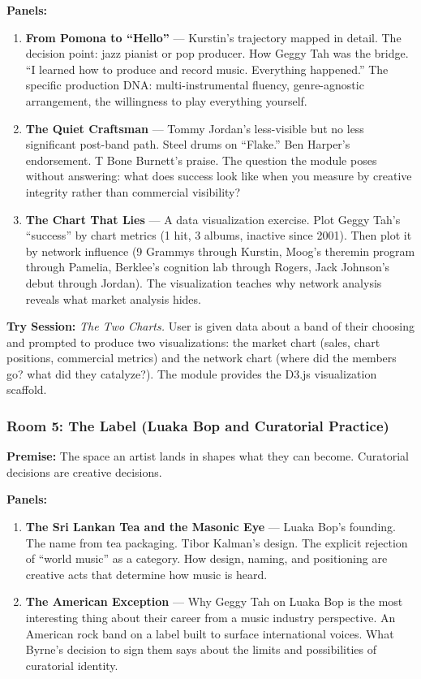 \documentclass[11pt,letterpaper]{article}
\begin{document}
\textbf{Panels:}
\begin{enumerate}[leftmargin=2em]
\item \textbf{From Pomona to ``Hello''} --- Kurstin's trajectory mapped in detail. The decision point: jazz pianist or pop producer. How Geggy Tah was the bridge. ``I learned how to produce and record music. Everything happened.'' The specific production DNA: multi-instrumental fluency, genre-agnostic arrangement, the willingness to play everything yourself.
\item \textbf{The Quiet Craftsman} --- Tommy Jordan's less-visible but no less significant post-band path. Steel drums on ``Flake.'' Ben Harper's endorsement. T Bone Burnett's praise. The question the module poses without answering: what does success look like when you measure by creative integrity rather than commercial visibility?
\item \textbf{The Chart That Lies} --- A data visualization exercise. Plot Geggy Tah's ``success'' by chart metrics (1 hit, 3 albums, inactive since 2001). Then plot it by network influence (9 Grammys through Kurstin, Moog's theremin program through Pamelia, Berklee's cognition lab through Rogers, Jack Johnson's debut through Jordan). The visualization teaches why network analysis reveals what market analysis hides.
\end{enumerate}

\textbf{Try Session:} \textit{The Two Charts.} User is given data about a band of their choosing and prompted to produce two visualizations: the market chart (sales, chart positions, commercial metrics) and the network chart (where did the members go? what did they catalyze?). The module provides the D3.js visualization scaffold.

\subsubsection{Room 5: The Label (Luaka Bop and Curatorial Practice)}

\textbf{Premise:} The space an artist lands in shapes what they can become. Curatorial decisions are creative decisions.

\textbf{Panels:}
\begin{enumerate}[leftmargin=2em]
\item \textbf{The Sri Lankan Tea and the Masonic Eye} --- Luaka Bop's founding. The name from tea packaging. Tibor Kalman's design. The explicit rejection of ``world music'' as a category. How design, naming, and positioning are creative acts that determine how music is heard.
\item \textbf{The American Exception} --- Why Geggy Tah on Luaka Bop is the most interesting thing about their career from a music industry perspective. An American rock band on a label built to surface international voices. What Byrne's decision to sign them says about the limits and possibilities of curatorial identity.
\end{enumerate}
\end{document}
